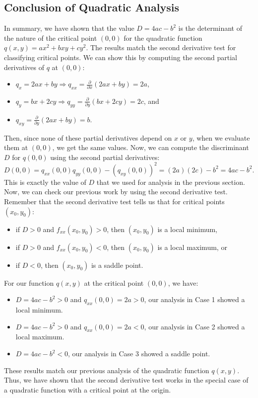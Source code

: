 \documentclass{article}
\begin{document}
\subsection{Conclusion of Quadratic Analysis}

In summary, we have shown that the value \( D = 4ac - b^{2} \) is the determinant of the nature of the critical point \( (0, 0) \) for the quadratic function \( q(x,y) = ax^{2} + bxy + cy^{2} \). The results match the second derivative test for classifying critical points. We can show this by computing the second partial derivatives of \( q \) at \( (0, 0) \):
\begin{itemize}
	\item \( q_{x} = 2ax + by \Rightarrow q_{xx} = \frac{\partial}{\partial x} (2ax + by) = 2a \),
	\item \( q_{y} = bx + 2cy \Rightarrow q_{yy} = \frac{\partial}{\partial y} (bx + 2cy) = 2c \), and
	\item \( q_{xy} = \frac{\partial}{\partial y} (2ax + by) = b \).
\end{itemize}
Then, since none of these partial derivatives depend on \( x \) or \( y \), when we evaluate them at \( (0, 0) \), we get the same values. Now, we can compute the discriminant \( D \) for \( q(0,0) \) using the second partial derivatives:
\[
	D(0, 0) = q_{xx}(0, 0)q_{yy}(0, 0) - (q_{xy}(0, 0))^{2} = (2a)(2c) - b^{2} = 4ac - b^{2}.
\]
This is exactly the value of \( D \) that we used for analysis in the previous section. \\

Now, we can check our previous work by using the second derivative test. Remember that the second derivative test tells us that for critical points \( (x_{0},y_{0}) \):
\begin{itemize}
	\item if \( D > 0 \) and \( f_{xx}(x_{0},y_{0}) > 0 \), then \( (x_{0},y_{0}) \) is a local minimum,
	\item if \( D > 0 \) and \( f_{xx}(x_{0},y_{0}) < 0 \), then \( (x_{0},y_{0}) \) is a local maximum, or
	\item if \( D < 0 \), then \( (x_{0},y_{0}) \) is a saddle point.
\end{itemize}
For our function \( q(x,y) \) at the critical point \( (0, 0) \), we have:
\begin{itemize}
	\item \( D = 4ac - b^{2} > 0 \) and \( q_{xx}(0,0) = 2a > 0 \), our analysis in Case 1 showed a local minimum.
	\item \( D = 4ac - b^{2} > 0 \) and \( q_{xx}(0,0) = 2a < 0 \), our analysis in Case 2 showed a local maximum.
	\item \( D = 4ac - b^{2} < 0 \), our analysis in Case 3 showed a saddle point.
\end{itemize}
These results match our previous analysis of the quadratic function \( q(x,y) \). Thus, we have shown that the second derivative test works in the special case of a quadratic function with a critical point at the origin.
\end{document}
